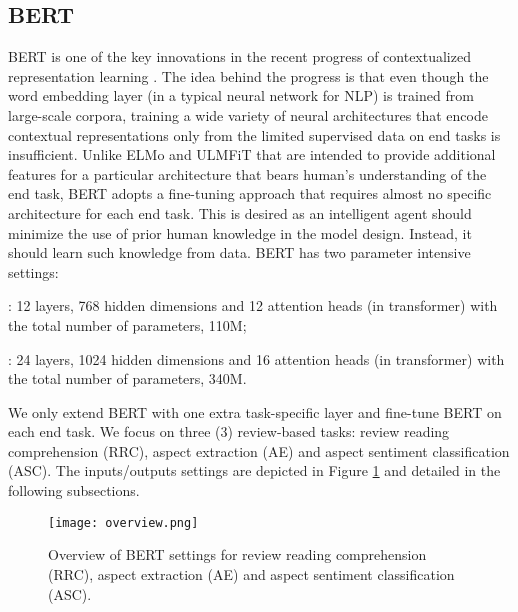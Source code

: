 \documentclass[11pt,a4paper]{article}
\begin{document}
\subsection{BERT}
BERT is one of the key innovations in the recent progress of contextualized representation learning \cite{peters2018deep,howard2018universal,radford2018improving,devlin2018bert}.
The idea behind the progress is that even though the word embedding \cite{mikolov2013distributed,pennington2014glove} layer (in a typical neural network for NLP) is trained from large-scale corpora, training a wide variety of neural architectures that encode contextual representations only from the limited supervised data on end tasks is insufficient.
Unlike ELMo \cite{peters2018deep} and ULMFiT \cite{howard2018universal} that are intended to provide additional features for a particular architecture that bears human's understanding of the end task, BERT adopts a fine-tuning approach that requires almost no specific architecture for each end task. This is desired as an intelligent agent should minimize the use of prior human knowledge in the model design. Instead, it should learn such knowledge from data. BERT has two parameter intensive settings: 

\noindent
: 12 layers, 768 hidden dimensions and 12 attention heads (in transformer) with the total number of parameters, 110M;

\noindent
: 24 layers, 1024 hidden dimensions and 16 attention heads (in transformer) with the total number of parameters, 340M.

We only extend BERT with one extra task-specific layer and fine-tune BERT on each end task.
We focus on three (3) review-based tasks: review reading comprehension (RRC), aspect extraction (AE) and aspect sentiment classification (ASC). The inputs/outputs settings are depicted in Figure \ref{fig:overview} and detailed in the following subsections.

\begin{figure}[t]
\centering    
\texttt{[image: overview.png]}
    \caption{Overview of BERT settings for review reading comprehension (RRC), aspect extraction (AE) and aspect sentiment classification (ASC).}
\label{fig:overview}
\vspace{-3mm}
\end{figure}
\end{document}
